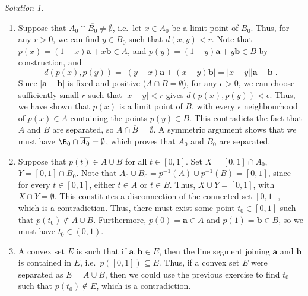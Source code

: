 \documentclass[11pt]{report}
\renewcommand\vec\boldsymbol
\def\va{\vec{a}}
\def\vb{\vec{b}}
\theoremstyle{remark}
\newtheorem*{solution}{Solution}
\begin{document}
    \begin{solution} \mbox{}
    \begin{enumerate}
        \item Suppose that $A_0 \cap
        \overline{B_0} \neq \emptyset$, i.e.\ let $x \in A_0$ be a limit point of
        $B_0$. Thus, for any $r > 0$, we can find $y \in B_0$ such that $d(x, y) <
        r$. Note that $p(x) = (1 - x)\va + x\vb \in A$, and $p(y) = (1 - y)\va +
        y\vb \in B$ by construction, and \[
            d(p(x), p(y)) = |(y - x)\va + (x - y)\vb| = |x - y| |\va - \vb|.
        \] Since $|\va - \vb|$ is fixed and positive ($A \cap B = \emptyset$), for
        any $\epsilon > 0$, we can choose sufficiently small $r$ such that $|x - y|
        < r$ gives $d(p(x), p(y)) < \epsilon$. Thus, we have shown that $p(x)$ is a
        limit point of $B$, with every $\epsilon$ neighbourhood of $p(x) \in A$
        containing the points $p(y) \in B$. This contradicts the fact that $A$ and
        $B$ are separated, so $A \cap \overline{B} = \emptyset$. A symmetric
        argument shows that we must have $\B_0 \cap \overline{A_0} = \emptyset$,
        which proves that $A_0$ and $B_0$ are separated.

        \item Suppose that $p(t) \in A \cup B$ for all $t \in [0, 1]$. Set $X = [0,
        1] \cap A_0$, $Y = [0, 1] \cap B_0$. Note that $A_0 \cup B_0 = p^{-1}(A)
        \cup p^{-1}(B) = [0, 1]$, since for every $t \in [0, 1]$, either $t \in A$
        or $t \in B$. Thus, $X \cup Y = [0, 1]$, with $X \cap Y = \emptyset$. This
        constitutes a disconnection of the connected set $[0, 1]$, which is a
        contradiction. Thus, there must exist some point $t_0 \in [0, 1]$ such that
        $p(t_0) \notin A \cup B$. Furthermore, $p(0) = \va \in A$ and $p(1) = \vb
        \in B$, so we must have $t_0 \in (0, 1)$.

        \item A convex set $E$ is such that if $\va, \vb \in E$, then the line
        segment joining $\va$ and $\vb$ is contained in $E$, i.e.\ $p([0, 1])
        \subseteq E$. Thus, if a convex set $E$ were separated as $E = A \cup B$,
        then we could use the previous exercise to find $t_0$ such that $p(t_0)
        \notin E$, which is a contradiction.
    \end{enumerate} 
    \end{solution}
\end{document}
